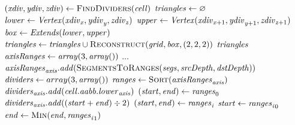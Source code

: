 \begin{algorithm}
	\centering
	\begin{algorithmic}[1]
			\State $(\var{xdiv}, \var{ydiv}, \var{zdiv}) \gets \Call{FindDividers}{\var{cell}}$
			\State $\mathit{triangles} \gets \varnothing$
				\State $\mathit{lower} \gets \mathit{Vertex}(\mathit{xdiv}_{\mathit{x}    }, \mathit{ydiv}_{\mathit{y}    }, \mathit{zdiv}_{\mathit{z}    })$
				\State $\mathit{upper} \gets \mathit{Vertex}(\mathit{xdiv}_{\mathit{x} + 1}, \mathit{ydiv}_{\mathit{y} + 1}, \mathit{zdiv}_{\mathit{z} + 1})$
				\State $\mathit{box} \gets \mathit{Extends}(\mathit{lower}, \mathit{upper})$
				\State $\var{triangles} \gets \var{triangles} \cup \Call{Reconstruct}{\var{grid}, \var{box}, (2, 2, 2)}$
			\EndFor
			\State \Return $\mathit{triangles}$
		\EndFunction
		\\
			\State $\mathit{axisRanges} \gets \mathit{array}(3, \mathit{array}())$
				\State $\dots$ 
					\State $\var{axisRanges}_{\var{axis}}.\var{add}(\Call{SegmentsToRanges}{\var{segs}, \var{srcDepth}, \var{dstDepth}})$
				\EndIf
			\EndFor
			\State $\mathit{dividers} \gets array(3, \mathit{array}())$
				\State $\var{ranges} \gets \Call{Sort}{\var{axisRanges}_{\var{axis}}}$ 
				\State $\mathit{dividers}_{\mathit{axis}}.\mathit{add}(\mathit{cell}.\mathit{aabb}.\mathit{lower}_{\mathit{axis}})$
				\State $(\mathit{start}, \mathit{end}) \gets \mathit{ranges}_0$
						\State $\mathit{dividers}_{\mathit{axis}}.\mathit{add}((\mathit{start} + \mathit{end}) \div 2)$
						\State $(\mathit{start}, \mathit{end}) \gets \mathit{ranges}_{\mathit{i}}$
					\Else
						\State $\mathit{start} \gets {\ensuremath{\mathit{ranges}}_{\ensuremath{\mathit{i}}}}_0$
						\State $\var{end} \gets \Call{Min}{\var{end}, {\var{ranges}_{\var{i}}}_1}$
					\EndIf
				\EndFor

\end{algorithmic}
\end{algorithm}

